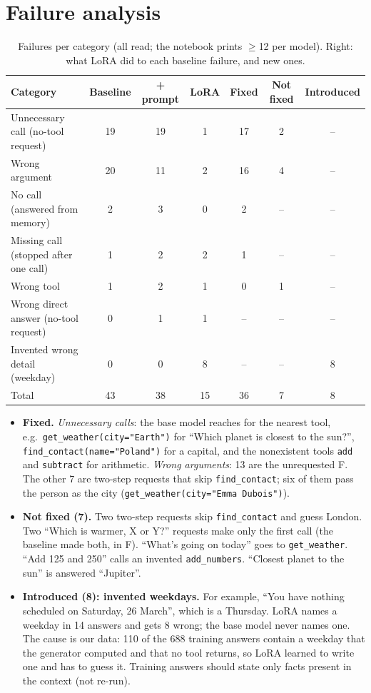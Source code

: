 \documentclass[10pt,a4paper]{article}
\newcommand{\tc}[1]{\texttt{\small #1}}
\begin{document}
\section{Failure analysis}
\begin{table}[h]
\centering\small
\caption{Failures per category (all read; the notebook prints $\ge$12 per model). Right: what LoRA did to each baseline failure, and new ones.}
\label{tab:fail}
\begin{tabular}{lccc@{\hspace{14pt}}ccc}
\toprule
Category & Baseline & + prompt & LoRA & Fixed & Not fixed & Introduced\\
\midrule
Unnecessary call (no-tool request)        & 19 & 19 & 1 & 17 & 2 & --\\
Wrong argument                             & 20 & 11 & 2 & 16 & 4 & --\\
No call (answered from memory)             & 2  & 3  & 0 & 2  & -- & --\\
Missing call (stopped after one call)      & 1  & 2  & 2 & 1  & -- & --\\
Wrong tool                                 & 1  & 2  & 1 & 0  & 1 & --\\
Wrong direct answer (no-tool request)      & 0  & 1  & 1 & -- & -- & --\\
Invented wrong detail (weekday)            & 0  & 0  & 8 & -- & -- & 8\\
\midrule
Total                                      & 43 & 38 & 15 & 36 & 7 & 8\\
\bottomrule
\end{tabular}
\end{table}
\begin{itemize}
\item \textbf{Fixed.} \emph{Unnecessary calls}: the base model reaches for the nearest tool, e.g.\ \tc{get\_weather(city="Earth")} for ``Which planet is closest to the sun?'', \tc{find\_contact(name="Poland")} for a capital, and the nonexistent tools \tc{add} and \tc{subtract} for arithmetic. \emph{Wrong arguments}: 13 are the unrequested \textdegree F. The other 7 are two-step requests that skip \tc{find\_contact}; six of them pass the person as the city (\tc{get\_weather(city="Emma Dubois")}).
\item \textbf{Not fixed (7).} Two two-step requests skip \tc{find\_contact} and guess London. Two ``Which is warmer, X or Y?'' requests make only the first call (the baseline made both, in \textdegree F). ``What's going on today'' goes to \tc{get\_weather}. ``Add 125 and 250'' calls an invented \tc{add\_numbers}. ``Closest planet to the sun'' is answered ``Jupiter''.
\item \textbf{Introduced (8): invented weekdays.} For example, ``You have nothing scheduled on Saturday, 26 March'', which is a Thursday. LoRA names a weekday in 14 answers and gets 8 wrong; the base model never names one. The cause is our data: 110 of the 688 training answers contain a weekday that the generator computed and that no tool returns, so LoRA learned to write one and has to guess it. Training answers should state only facts present in the context (not re-run).
\end{itemize}
\end{document}
